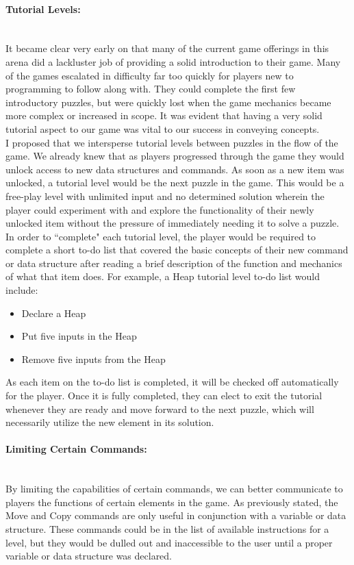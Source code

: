 \paragraph{Tutorial Levels:} ~\\
It became clear very early on that many of the current game offerings in this arena did a lackluster job of
providing a solid introduction to their game. Many of the games escalated in difficulty far too quickly for
players new to programming to follow along with. They could complete the first few introductory puzzles,
but were quickly lost when the game mechanics became more complex or increased in scope. It was evident
that having a very solid tutorial aspect to our game was vital to our success in conveying concepts.\\

I proposed that we intersperse tutorial levels between puzzles in the flow of the game. We already knew that
as players progressed through the game they would unlock access to new data structures and commands. As
soon as a new item was unlocked, a tutorial level would be the next puzzle in the game. This would be a free-play
level with unlimited input and no determined solution wherein the player could experiment with and explore
the functionality of their newly unlocked item without the pressure of immediately needing it to solve a puzzle.\\

In order to ``complete" each tutorial level, the player would be required to complete a short to-do list that
covered the basic concepts of their new command or data structure after reading a brief description of the function
and mechanics of what that item does. For example, a Heap tutorial level to-do list would include:
\begin{itemize}
	\item Declare a Heap
	\item Put five inputs in the Heap
	\item Remove five inputs from the Heap
\end{itemize}
As each item on the to-do list is completed, it will be checked off automatically for the player. Once it is fully
completed, they can elect to exit the tutorial whenever they are ready and move forward to the next
puzzle, which will necessarily utilize the new element in its solution. \\

\paragraph{Limiting Certain Commands:} ~\\
By limiting the capabilities of certain commands, we can better communicate to players the functions of certain
elements in the game. As previously stated, the Move and Copy commands are only useful in conjunction with a
variable or data structure. These commands could be in the list of available instructions for a level, but they would be
dulled out and inaccessible to the user until a proper variable or data structure was declared.\\

